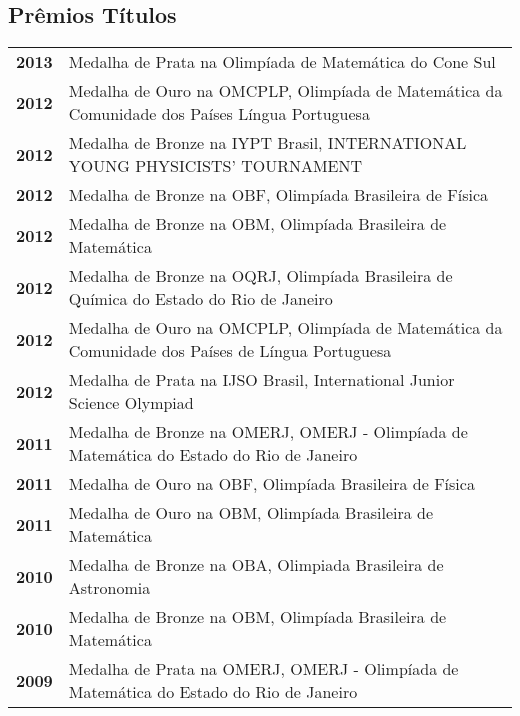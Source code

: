 \documentclass[a4paper, oneside, final]{scrartcl} %
\begin{document}
\begin{center}


\section{Prêmios Títulos}

\begin{tabular}{ @{} >{\bfseries}l @{\hspace{5ex}} l }
2013 & \multicolumn{1}{p{15cm}}{\raggedright Medalha de Prata na Olimpíada de Matemática do Cone Sul} \\
2012 & \multicolumn{1}{p{15cm}}{\raggedright Medalha de Ouro na OMCPLP, Olimpíada de Matemática da Comunidade dos Países Língua Portuguesa} \\
2012 & \multicolumn{1}{p{15cm}}{\raggedright Medalha de Bronze na IYPT Brasil, INTERNATIONAL YOUNG PHYSICISTS' TOURNAMENT} \\
2012 & \multicolumn{1}{p{15cm}}{\raggedright Medalha de Bronze na OBF, Olimpíada Brasileira de Física} \\
2012 & \multicolumn{1}{p{15cm}}{\raggedright Medalha de Bronze na OBM, Olimpíada Brasileira de Matemática} \\
2012 & \multicolumn{1}{p{15cm}}{\raggedright Medalha de Bronze na OQRJ, Olimpíada Brasileira de Química do Estado do Rio de Janeiro} \\
2012 & \multicolumn{1}{p{15cm}}{\raggedright Medalha de Ouro na OMCPLP, Olimpíada de Matemática da Comunidade dos Países de Língua Portuguesa} \\
2012 & \multicolumn{1}{p{15cm}}{\raggedright Medalha de Prata na IJSO Brasil, International Junior Science Olympiad} \\
2011 & \multicolumn{1}{p{15cm}}{\raggedright Medalha de Bronze na OMERJ, OMERJ - Olimpíada de Matemática do Estado do Rio de Janeiro} \\
2011 & \multicolumn{1}{p{15cm}}{\raggedright Medalha de Ouro na OBF, Olimpíada Brasileira de Física} \\
2011 & \multicolumn{1}{p{15cm}}{\raggedright Medalha de Ouro na OBM, Olimpíada Brasileira de Matemática} \\
2010 & \multicolumn{1}{p{15cm}}{\raggedright Medalha de Bronze na OBA, Olimpiada Brasileira de Astronomia} \\
2010 & \multicolumn{1}{p{15cm}}{\raggedright Medalha de Bronze na OBM, Olimpíada Brasileira de Matemática} \\
2009 & \multicolumn{1}{p{15cm}}{\raggedright Medalha de Prata na OMERJ, OMERJ - Olimpíada de Matemática do Estado do Rio de Janeiro}
\end{tabular}


\end{center}
\end{document}
